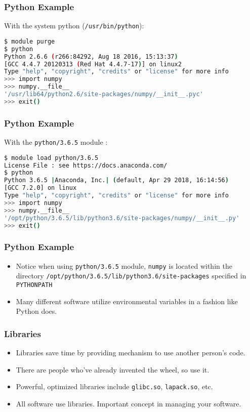 \documentclass{beamer}
\newcommand{\code}[1]{\colorbox{codegray}{\texttt{#1}}}
\begin{document}
\begin{frame}[fragile]
\frametitle{Python Example}
With the system python (\code{/usr/bin/python}):
\begingroup
\scriptsize
\begin{lstlisting}[backgroundcolor = \color{codegray}, language = Bash, showstringspaces=false]
$ module purge
$ python
Python 2.6.6 (r266:84292, Aug 18 2016, 15:13:37)
[GCC 4.4.7 20120313 (Red Hat 4.4.7-17)] on linux2
Type "help", "copyright", "credits" or "license" for more info
>>> import numpy
>>> numpy.__file__
'/usr/lib64/python2.6/site-packages/numpy/__init__.pyc'
>>> exit()
\end{lstlisting}
\endgroup
\end{frame}


\begin{frame}[fragile]
\frametitle{Python Example}
With the \code{python/3.6.5} module :
\begingroup
\scriptsize
\begin{lstlisting}[backgroundcolor = \color{codegray}, language = Bash, showstringspaces=false]
$ module load python/3.6.5
License File : see https://docs.anaconda.com/
$ python
Python 3.6.5 |Anaconda, Inc.| (default, Apr 29 2018, 16:14:56)
[GCC 7.2.0] on linux
Type "help", "copyright", "credits" or "license" for more info
>>> import numpy
>>> numpy.__file__
'/opt/python/3.6.5/lib/python3.6/site-packages/numpy/__init__.py'
>>> exit()
\end{lstlisting}
\endgroup
\end{frame}


\begin{frame}
\frametitle{Python Example}
\begin{itemize}
    \item Notice when using \code{python/3.6.5} module, \code{numpy} is located within the directory \code{/opt/python/3.6.5/lib/python3.6/site-packages} specified in \code{PYTHONPATH} 
    \bigskip
    \pause
    \item Many different software utilize environmental variables in a fashion like Python does.
\end{itemize}
\end{frame}


\begin{frame}
\frametitle{Libraries}
\begin{itemize}
    \item Libraries save time by providing mechanism to use another person's code.
    \bigskip
    \pause
    \item There are people who've already invented the wheel, so use it.
    \bigskip
    \pause
    \item Powerful, optimized libraries include \code{glibc.so}, \code{lapack.so}, etc.
    \bigskip
    \pause
    \item All software use libraries. Important concept in managing your software.
\end{itemize}
\end{frame}
\end{document}

